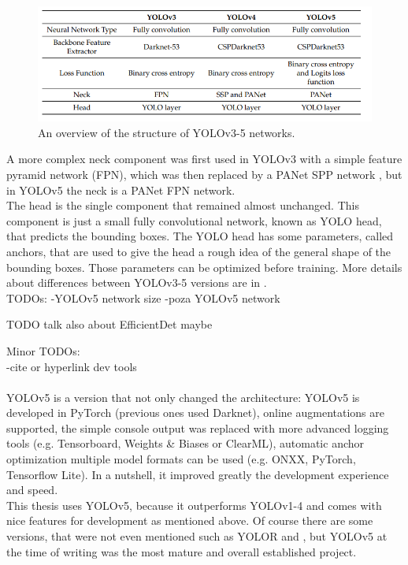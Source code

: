 \begin{figure}
\includegraphics[width=\textwidth]{images/yolo_images/yolo_compare}
\caption{An overview of the structure of YOLOv3-5 networks.}
\end{figure}

A more complex neck component was first used in YOLOv3 with a simple feature pyramid network (FPN), which was then replaced by a PANet SPP network \cite{panet_paper, spp_paper}, but in YOLOv5 the neck is a PANet FPN network. \\
The head is the single component that remained almost unchanged. This component is just a small fully convolutional network, known as YOLO head, that predicts the bounding boxes. The YOLO head has some parameters, called anchors, that are used to give the head a rough idea of the general shape of the bounding boxes. Those parameters can be optimized before training.  More details about differences between YOLOv3-5 versions are in \cite{yolo_compare}.\\

TODOs:
-YOLOv5 network size
-poza YOLOv5 network

TODO talk also about EfficientDet maybe

Minor TODOs:\\
-cite or hyperlink dev tools \\
\\
YOLOv5 is a version that not only changed the architecture: YOLOv5 is developed in PyTorch (previous ones used Darknet), online augmentations are supported, the simple console output was replaced with more advanced logging tools (e.g. Tensorboard, Weights \& Biases or ClearML), automatic anchor optimization multiple model formats can be used (e.g. ONXX, PyTorch, Tensorflow Lite). In a nutshell, it improved greatly the development experience and speed. \\
This thesis uses YOLOv5, because it outperforms YOLOv1-4 \cite{yolovx_paper} and comes with nice features for development as mentioned above. Of course there are some versions, that were not even mentioned such as YOLOR \cite{yolor_paper} and \cite{yolovx_paper}, but YOLOv5 at the time of writing was the most mature and overall established project. \\




